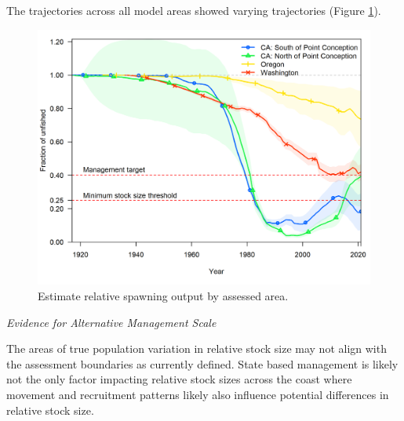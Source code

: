 \documentclass[11pt,
  english,
  a4paper,
]{article}
\begin{document}
\leavevmode\tagmcend\tagstructend\par


The trajectories across all model areas showed varying trajectories (Figure \ref{fig:relb-comparison}).

\leavevmode\tagmcend\tagstructend\par


\begin{figure}
\centering
\includegraphics[width=1\textwidth,height=1\textheight]{comprare_compare4_Bratio_uncertainty.png}
\caption{Estimate relative spawning output by assessed area.\label{fig:relb-comparison}}
\end{figure}

\tagmcend\tagstructend

\clearpage


\emph{Evidence for Alternative Management Scale}

\leavevmode\tagmcend\tagstructend\par


The areas of true population variation in relative stock size may not align with the assessment boundaries as currently defined. State based management is likely not the only factor impacting relative stock sizes across the coast where movement and recruitment patterns likely also influence potential differences in relative stock size.
\end{document}
